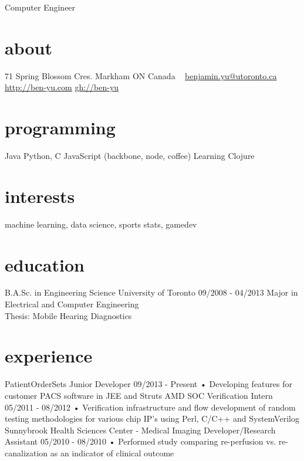 \documentclass[]{friggeri-cv}
\begin{document}
       {Computer Engineer}


\begin{aside}
  \section{about}
    71 Spring Blossom Cres.
    Markham ON
    Canada
    ~
    \href{mailto:benjamin.yu@utoronto.ca}{benjamin.yu@utoronto.ca}
    \href{http://ben-yu.com}{http://ben-yu.com}
    \href{https://github.com/ben-yu}{gh://ben-yu}
  \section{programming}
    Java
    Python, C
    JavaScript
    (backbone, node, coffee)
    Learning Clojure
\end{aside}

\section{interests}

machine learning, data science, sports stats, gamedev

\section{education}

\begin{entrylist}
  \entry
    {B.A.Sc. in Engineering Science}
    {University of Toronto}
    {09/2008 - 04/2013}
    {Major in Electrical and Computer Engineering \\
     Thesis: Mobile Hearing Diagnostics}

\end{entrylist}

\section{experience}

\begin{entrylist}
  \entry
    {PatientOrderSets}
    {Junior Developer}
    {09/2013 - Present}
    {• Developing features for customer PACS software in JEE and Struts}
  \entry
    {AMD}
    {SOC Verification Intern}
    {05/2011 - 08/2012}
    {• Verification infrastructure and  flow development of random testing methodologies for various chip   IP’s using Perl, C/C++ and SystemVerilog}
  \entry
    {Sunnybrook Health Sciences Center - Medical Imaging}
    {Developer/Research Assistant}
    {05/2010 - 08/2010}
    {• Performed study comparing re-perfusion vs. re-canalization as an indicator of clinical outcome}
\end{entrylist}
\end{document}
